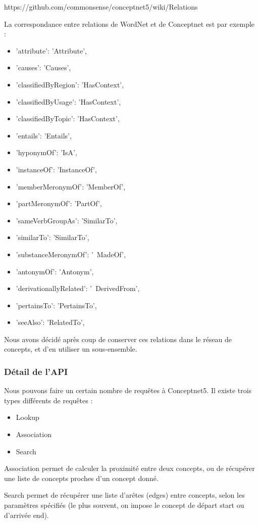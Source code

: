 \documentclass[a4paper,12pt]{article}
\begin{document}
https://github.com/commonsense/conceptnet5/wiki/Relations

La correspondance entre relations de WordNet et de Conceptnet est par exemple :
\begin{itemize}
 \item 'attribute': 'Attribute',
 \item 'causes': 'Causes',
 \item 'classifiedByRegion': 'HasContext',
 \item 'classifiedByUsage': 'HasContext',
 \item 'classifiedByTopic': 'HasContext',
 \item 'entails': 'Entails',
 \item 'hyponymOf': 'IsA',
 \item 'instanceOf': 'InstanceOf',
  \item  'memberMeronymOf': 'MemberOf',
  \item  'partMeronymOf': 'PartOf',
  \item  'sameVerbGroupAs': 'SimilarTo',
  \item  'similarTo': 'SimilarTo',
  \item  'substanceMeronymOf': '~MadeOf',
  \item  'antonymOf': 'Antonym',
  \item  'derivationallyRelated': '~DerivedFrom',
  \item  'pertainsTo': 'PertainsTo',
  \item  'seeAlso': 'RelatedTo',
\end{itemize}

Nous avons décidé après coup de conserver ces relations dans le réseau de concepts, et d'en utiliser un sous-ensemble.

\subsubsection{Détail de l'API}

Nous pouvons faire un certain nombre de requêtes à Conceptnet5. Il existe trois types différents de requêtes :
\begin{itemize}
 \item Lookup
 \item Association
 \item Search
\end{itemize}
Association permet de calculer la proximité entre deux concepts, ou de récupérer une liste de concepts proches d'un concept donné.

Search permet de récupérer une liste d'arêtes (edges) entre concepts, selon les paramètres spécifiés (le plus souvent, on impose le concept de départ start ou d'arrivée end). 
\end{document}

